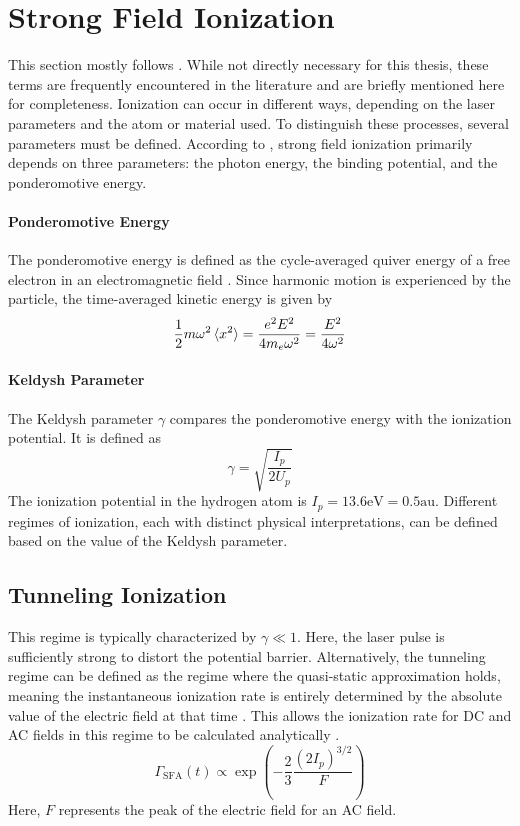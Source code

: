 \section{Strong Field Ionization}
This section mostly follows \cite{manorammasterthesis}.
While not directly necessary for this thesis, these terms are frequently encountered in the literature and are briefly mentioned here for completeness.
Ionization can occur in different ways, depending on the laser parameters and the atom or material used.
To distinguish these processes, several parameters must be defined.
According to \cite{Keldysh:1965ojf}, strong field ionization primarily depends on three parameters: the photon energy, the binding potential, and the ponderomotive energy.

\paragraph{Ponderomotive Energy}
The ponderomotive energy is defined as the cycle-averaged quiver energy of a free electron in an electromagnetic field \cite{manorammasterthesis}.
Since harmonic motion is experienced by the particle, the time-averaged kinetic energy is given by
\begin{equation*}
    \frac{1}{2}m\omega^2 \braket{x^2}=\frac{e^2E^2}{4m_e\omega^2} = \frac{E^2}{4\omega^2}
\end{equation*}

\paragraph{Keldysh Parameter}
The Keldysh parameter $\gamma$ compares the ponderomotive energy with the ionization potential.
It is defined as
\begin{equation*}
    \gamma = \sqrt{\frac{I_p}{2U_p}}
\end{equation*}
The ionization potential in the hydrogen atom is $I_p = 13.6\mathrm{eV} = 0.5 \mathrm{au.}$
Different regimes of ionization, each with distinct physical interpretations, can be defined based on the value of the Keldysh parameter.

\subsection{Tunneling Ionization}
This regime is typically characterized by $\gamma \ll 1$.
Here, the laser pulse is sufficiently strong to distort the potential barrier.
Alternatively, the tunneling regime can be defined as the regime where the quasi-static approximation holds, meaning the instantaneous ionization rate is entirely determined by the absolute value of the electric field at that time \cite{manorammasterthesis}.
This allows the ionization rate for DC and AC fields in this regime to be calculated analytically \cite{tunnel_ion_complexatoms}.
\begin{equation*}
    \Gamma_{\mathrm{SFA}}(t) \propto \exp\left(-\frac{2}{3}\frac{(2I_p)^{3/2}}{F}\right)
\end{equation*}
Here, $F$ represents the peak of the electric field for an AC field.

